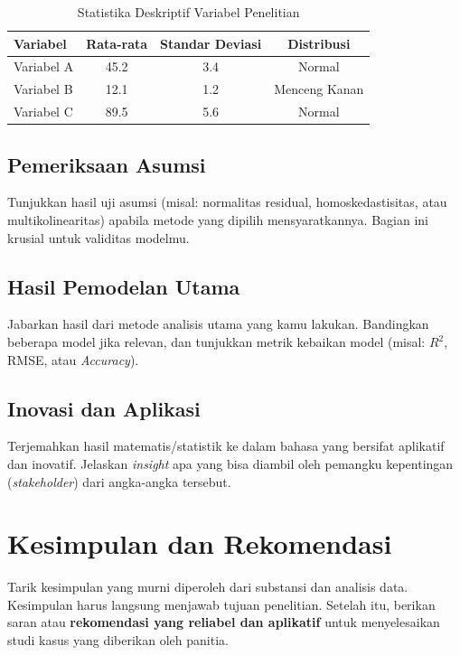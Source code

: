 \documentclass[12pt, a4paper]{article}
\begin{document}
\begin{table}[H]
    \centering
    \caption{Statistika Deskriptif Variabel Penelitian}
    \vspace{0.5em}
    \begin{tabular}{l c c c}
        \toprule
        \textbf{Variabel} & \textbf{Rata-rata} & \textbf{Standar Deviasi} & \textbf{Distribusi} \\
        \midrule
        Variabel A & 45.2 & 3.4 & Normal \\
        Variabel B & 12.1 & 1.2 & Menceng Kanan \\
        Variabel C & 89.5 & 5.6 & Normal \\
        \bottomrule
    \end{tabular}
\end{table}

\subsection{Pemeriksaan Asumsi}
Tunjukkan hasil uji asumsi (misal: normalitas residual, homoskedastisitas, atau multikolinearitas) apabila metode yang dipilih mensyaratkannya. Bagian ini krusial untuk validitas modelmu.

\subsection{Hasil Pemodelan Utama}
Jabarkan hasil dari metode analisis utama yang kamu lakukan. Bandingkan beberapa model jika relevan, dan tunjukkan metrik kebaikan model (misal: $R^2$, RMSE, atau \textit{Accuracy}).

\subsection{Inovasi dan Aplikasi}
Terjemahkan hasil matematis/statistik ke dalam bahasa yang bersifat aplikatif dan inovatif. Jelaskan \textit{insight} apa yang bisa diambil oleh pemangku kepentingan (\textit{stakeholder}) dari angka-angka tersebut.

\section{Kesimpulan dan Rekomendasi}
Tarik kesimpulan yang murni diperoleh dari substansi dan analisis data. Kesimpulan harus langsung menjawab tujuan penelitian. Setelah itu, berikan saran atau \textbf{rekomendasi yang reliabel dan aplikatif} untuk menyelesaikan studi kasus yang diberikan oleh panitia.
\end{document}
